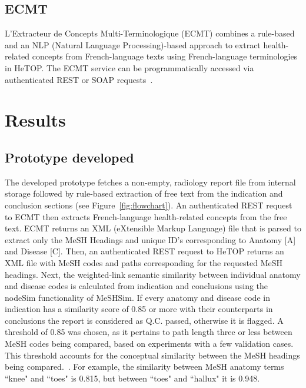 \documentclass{IOS-Book-Article}
\begin{document}
\subsection{ECMT}
%
L'Extracteur de Concepts Multi-Terminologique (ECMT) combines a rule-based and an NLP (Natural Language Processing)-based approach to extract health-related concepts from French-language texts using French-language terminologies in HeTOP.
The ECMT service can be programmatically accessed via authenticated REST or SOAP requests~\cite{hetop, Metzger_undated-dl}.
%
\section{Results}
%
\subsection{Prototype developed}
%
The developed prototype fetches a non-empty, radiology report file from internal storage followed by rule-based extraction of free text from the indication and conclusion sections (see Figure~\ref{fig:flowchart}).
An authenticated REST request to ECMT then extracts French-language health-related concepts from the free text.
ECMT returns an XML (eXtensible Markup Language) file that is parsed to extract only the MeSH Headings and unique ID's corresponding to Anatomy [A] and Disease [C].
Then, an authenticated REST request to HeTOP returns an XML file with MeSH codes and paths corresponding for the requested MeSH headings.
Next, the weighted-link semantic similarity between individual anatomy and disease codes is calculated from indication and conclusions using the nodeSim functionality of MeSHSim.
If every anatomy and disease code in indication has a similarity score of 0.85 or more with their counterparts in conclusions the report is considered as Q.C. passed, otherwise it is flagged.
A threshold of 0.85 was chosen, as it pertains to path length three or less between MeSH codes being compared, based on experiments with a few validation cases.
This threshold accounts for the conceptual similarity between the MeSH headings being compared.~\cite{meshSim}.
For example, the similarity between MeSH anatomy terms ``knee" and ``toes" is 0.815, but between ``toes" and ``hallux" it is 0.948.
\end{document}
